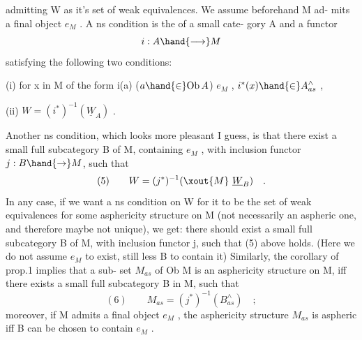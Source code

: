 
admitting W as it's set of weak equivalences.  We assume beforehand M ad-%
mits a final object $e_M$ .  A ns condition is the  of a small cate-%
gory A and a functor
\[ i: A \hand{\longrightarrow} M \]
satisfying the following two conditions:

(i) for x in M of the form i(a) ($a \hand{\in} \mathrm{Ob}\, A$) \hand{\uline{\textcolor{black}{or}}} $e_M$ , $i^{*}(x) \hand{\in} A^{\wedge}_{as}$ ,

(ii) $W = (i^{*})^{-1}(\underline{W}_A)$ .

Another ns condition, which looks more pleasant I guess, is that there
exist a small full subcategory B of M, containing $e_M$ , with inclusion
functor $j: B \hand{\to} M$, such that
\[ (5) \qquad W = (j^{*})^{-1}(\xout{M}\ \underline{W}_B) \quad . \]
In any case, if we want a ns condition on W for it to be the set of
weak equivalences for some asphericity structure on M (not necessarily
an aspheric one, and therefore maybe not unique), we get: there should
exist a small full subcategory B of M, with inclusion functor j, such
that (5) above holds. (Here we do not assume $e_M$ to exist, still less B
to contain it) Similarly, the corollary of prop.1 implies that a sub-%
set $M_{as}$ of Ob M is an asphericity structure on M, iff there exists a
small full subcategory B in M, such that
\[ (6) \qquad M_{as} = (j^{*})^{-1}(B^{\wedge}_{as}) \quad ; \]
moreover, if M admits a final object $e_M$ , the asphericity structure $M_{as}$
is aspheric iff B can be chosen to contain $e_M$ .


